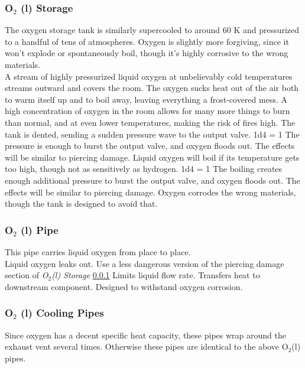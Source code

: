 \documentclass[a4paper]{article}
\begin{document}
\vspace{-0.5cm} \hspace{-18pt} \subsubsection{O$_2$ (l) Storage} \label{engine_o2_storage} \vspace{-0.2cm}
The oxygen storage tank is similarly supercooled to around 60 K and pressurized to a handful of tens of atmospheres. Oxygen is slightly more forgiving, since it won't explode or spontaneously boil, though it's highly corrosive to the wrong materials.
\\ \pbhw
{A stream of highly pressurized liquid oxygen at unbelievably cold temperatures streams outward and covers the room. The oxygen sucks heat out of the air both to warm itself up and to boil away, leaving everything a frost-covered mess. A high concentration of oxygen in the room allows for many more things to burn than normal, and at even lower temperatures, making the risk of fires high.}
{The tank is dented, sending a sudden pressure wave to the output valve. \newline 1d4 = 1 The pressure is enough to burst the output valve, and oxygen floods out. The effects will be similar to piercing damage.}
{Liquid oxygen will boil if its temperature gets too high, though not as sensitively as hydrogen. \newline 1d4 = 1 The boiling creates enough additional pressure to burst the output valve, and oxygen floods out. The effects will be similar to piercing damage.}
{Oxygen corrodes the wrong materials, though the tank is designed to avoid that. }


\vspace{-0.5cm} \hspace{-18pt} \subsubsection{O$_2$ (l) Pipe} \label{engine_o2_pipe} \vspace{-0.2cm}
This pipe carries liquid oxygen from place to place. 
\\ \pbhw
{Liquid oxygen leaks out. Use a less dangerous version of the piercing damage section of \textit{O$_2$(l) Storage} \ref{engine_o2_storage}}
{Limits liquid flow rate.}
{Transfers heat to downstream component.}
{Designed to withstand oxygen corrosion.}


\vspace{-0.5cm} \hspace{-18pt} \subsubsection{O$_2$ (l) Cooling Pipes} \label{engine_o2_cooling} \vspace{-0.2cm}
Since oxygen has a decent specific heat capacity, these pipes wrap around the exhaust vent several times. Otherwise these pipes are identical to the above O$_2$(l) pipes.
\end{document}
